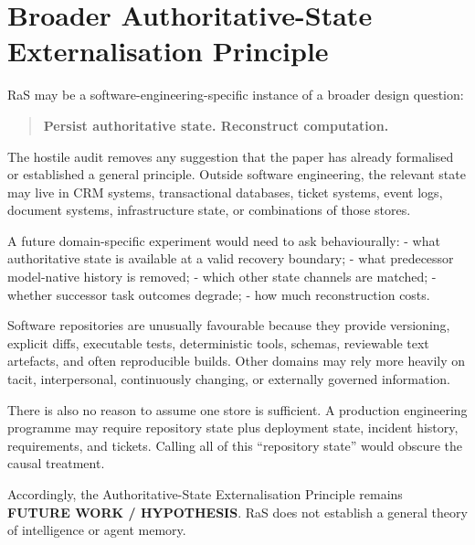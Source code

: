 \section{Broader Authoritative-State Externalisation Principle}
\label{sec:authoritative-principle}

RaS may be a software-engineering-specific instance of a broader design question:

\begin{quote}
\textbf{Persist authoritative state. Reconstruct computation.}
\end{quote}

The hostile audit removes any suggestion that the paper has already formalised or established a general principle. Outside software engineering, the relevant state may live in CRM systems, transactional databases, ticket systems, event logs, document systems, infrastructure state, or combinations of those stores.

A future domain-specific experiment would need to ask behaviourally:
- what authoritative state is available at a valid recovery boundary;
- what predecessor model-native history is removed;
- which other state channels are matched;
- whether successor task outcomes degrade;
- how much reconstruction costs.

Software repositories are unusually favourable because they provide versioning, explicit diffs, executable tests, deterministic tools, schemas, reviewable text artefacts, and often reproducible builds. Other domains may rely more heavily on tacit, interpersonal, continuously changing, or externally governed information.

There is also no reason to assume one store is sufficient. A production engineering programme may require repository state plus deployment state, incident history, requirements, and tickets. Calling all of this “repository state” would obscure the causal treatment.

Accordingly, the Authoritative-State Externalisation Principle remains \textbf{FUTURE WORK / HYPOTHESIS}. RaS does not establish a general theory of intelligence or agent memory.
